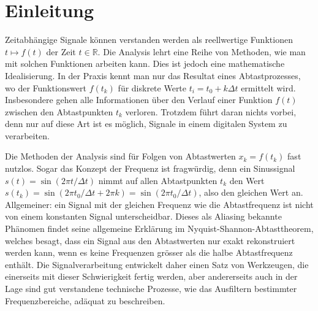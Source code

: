 %
%
%
\chapter*{Einleitung\label{chapter:einleitung}}
Zeitabhängige Signale können verstanden werden als reellwertige
Funktionen $t\mapsto f(t)$ der Zeit $t\in\mathbb R$.
Die Analysis lehrt eine Reihe von Methoden, wie man mit solchen
Funktionen arbeiten kann.
Dies ist jedoch eine mathematische Idealisierung.
In der Praxis kennt man nur das Resultat eines Abtastprozesses, wo
der Funktionswert $f(t_k)$ für diskrete Werte $t_i=t_0 + k\Delta t$
ermittelt wird.
Insbesondere gehen alle Informationen über den Verlauf einer Funktion $f(t)$
zwischen den Abtastpunkten $t_k$ verloren.
Trotzdem führt daran nichts vorbei, denn nur auf diese Art ist es möglich,
Signale in einem digitalen System zu verarbeiten.

%
Die Methoden der Analysis sind für Folgen von Abtastwerten $x_k=f(t_k)$
fast nutzlos.
Sogar das Konzept der Frequenz ist fragwürdig, denn ein Sinussignal
$s(t)=\sin(2\pi t/\Delta t)$ nimmt auf allen Abtastpunkten $t_k$
den Wert $s(t_k)=\sin(2\pi t_0/\Delta t+2\pi k)=\sin(2\pi t_0/\Delta t)$,
also den gleichen Wert an.
Allgemeiner: ein Signal mit der gleichen Frequenz wie die Abtastfrequenz
ist nicht von einem konstanten Signal unterscheidbar.
Dieses als Aliasing bekannte Phänomen findet seine allgemeine Erklärung
%
im Nyquist-Shannon-Abtasttheorem, welches besagt, dass ein Signal
%
%
%
aus den Abtastwerten nur exakt rekonstruiert werden kann, wenn es
keine Frequenzen grösser als die halbe Abtastfrequenz enthält.
Die Signalverarbeitung entwickelt daher einen Satz von Werk\-zeugen, die
einerseits mit dieser Schwierigkeit fertig werden, aber andererseits auch
in der Lage sind gut verstandene technische Prozesse, wie das Ausfiltern
bestimmter Frequenzbereiche, adäquat zu beschreiben.

